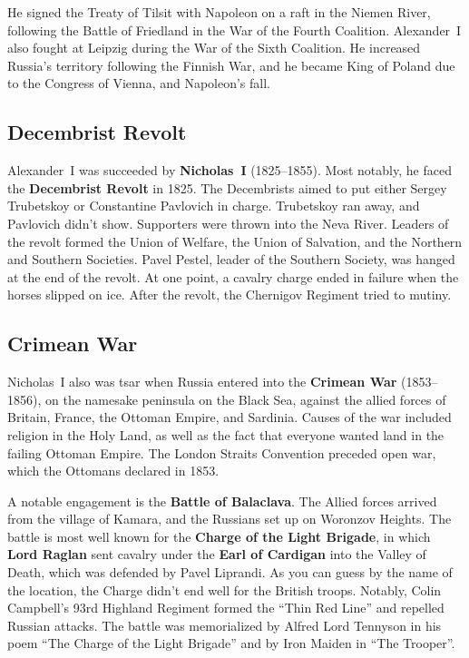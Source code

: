 He signed the Treaty of Tilsit with Napoleon on a raft in the Niemen River,
following the Battle of Friedland in the War of the Fourth Coalition.
Alexander~I also fought at Leipzig during the War of the Sixth Coalition.
He increased Russia's territory following the Finnish War,
and he became King of Poland due to the Congress of Vienna, and Napoleon's fall.

\subsection*{Decembrist Revolt}

Alexander~I was succeeded by \textbf{Nicholas~I} (1825--1855).
Most notably, he faced the \textbf{Decembrist Revolt} in 1825.
The Decembrists aimed to put either Sergey Trubetskoy or Constantine Pavlovich in charge.
Trubetskoy ran away, and Pavlovich didn't show.
Supporters were thrown into the Neva River.
Leaders of the revolt formed the Union of Welfare, the Union of Salvation,
and the Northern and Southern Societies.
Pavel Pestel, leader of the Southern Society, was hanged at the end of the revolt.
At one point, a cavalry charge ended in failure when the horses slipped on ice.
After the revolt, the Chernigov Regiment tried to mutiny.

\subsection*{Crimean War}

Nicholas~I also was tsar when Russia entered into the \textbf{Crimean War} (1853--1856),
on the namesake peninsula on the Black Sea,
against the allied forces of Britain, France, the Ottoman Empire, and Sardinia.
Causes of the war included religion in the Holy Land,
as well as the fact that everyone wanted land in the failing Ottoman Empire.
The London Straits Convention preceded open war, which the Ottomans declared in 1853.

A notable engagement is the \textbf{Battle of Balaclava}.
The Allied forces arrived from the village of Kamara, and the Russians set up on Woronzov Heights.
The battle is most well known for the \textbf{Charge of the Light Brigade},
in which \textbf{Lord Raglan} sent cavalry under the \textbf{Earl of Cardigan}
into the Valley of Death,
which was defended by Pavel Liprandi.
As you can guess by the name of the location, the Charge didn't end well for the British troops.
Notably, Colin Campbell's 93rd Highland Regiment formed the ``Thin Red Line'' and repelled Russian attacks.
The battle was memorialized by Alfred Lord Tennyson in his poem ``The Charge of the Light Brigade''
and by Iron Maiden in ``The Trooper''.

